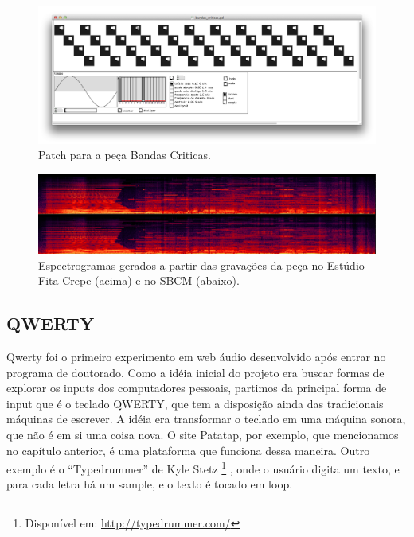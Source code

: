 \begin{figure}[htb]
    \caption{\label{bandaspatch}Patch para a peça Bandas Criticas. }
    \begin{center}
    \includegraphics[width=1\linewidth]{pictures/cap3/bandascriticaspd}
    \end{center}
\end{figure}

\begin{figure}[htb]
    \caption{\label{bandasciticasspec}Espectrogramas gerados a partir das gravações da peça no Estúdio Fita Crepe (acima) e no SBCM (abaixo). }
    \begin{center}
    \includegraphics[width=1\linewidth]{pictures/cap3/bandascriticasspectro2}
    \end{center}
\end{figure}



\subsection{QWERTY}
\label{sec:QWERTY}
Qwerty foi o primeiro experimento em web áudio desenvolvido após entrar no programa de doutorado. Como a idéia inicial do projeto era buscar formas de explorar os inputs dos computadores pessoais, partimos da principal forma de input que é o teclado QWERTY, que tem a disposição ainda das tradicionais máquinas de escrever. A idéia era transformar o teclado em uma máquina sonora, que não é em si uma coisa nova. O site Patatap, por exemplo, que mencionamos no capítulo anterior, é uma plataforma que funciona dessa maneira. Outro exemplo é o ``Typedrummer'' de Kyle Stetz \footnote{Disponível em: \url{http://typedrummer.com/}} , onde o usuário digita um texto, e para cada letra há um sample, e o texto é tocado em loop.


